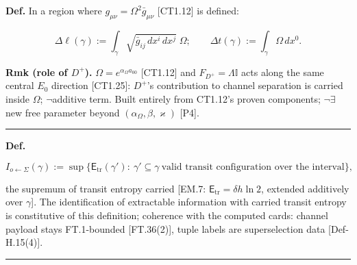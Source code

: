 \begin{definition}\label{tag:Def-H-2}
\textbf{Def.} In a region where $g_{\mu\nu}=\Omega^2\bar g_{\mu\nu}$ [CT1.12] is defined:

\[
\Delta\ell(\gamma):=\int_\gamma\sqrt{\bar g_{ij}\,dx^i\,dx^j}\;\Omega;\qquad
\Delta t(\gamma):=\int_\gamma\Omega\,dx^0 .
\]

\textbf{Rmk (role of $D^+$).} $\Omega=e^{\alpha_\Omega a_{00}}$ [CT1.12] and $F_{D^+}=\Lambda\mathbb I$ acts along the same central $E_0$ direction [CT1.25]: $D^+$'s contribution to channel separation is carried inside $\Omega$; $\neg$additive term. Built entirely from CT1.12's proven components; $\neg\exists$ new free parameter beyond $(\alpha_\Omega,\beta,\varkappa)$ [P4].

\vspace{2pt}\noindent\rule{\textwidth}{0.4pt}\vspace{2pt}

\end{definition}

\begin{definition}\label{tag:Def-H-3}
\textbf{Def.}

\[
I_{o\leftarrow\Sigma}(\gamma):=\sup\bigl\{\mathsf E_{\mathrm{tr}}(\gamma'):\ \gamma'\subseteq\gamma\ \text{valid transit configuration over the interval}\bigr\},
\]

the supremum of transit entropy carried [EM.7: $\mathsf E_{\mathrm{tr}}=\delta h\ln2$, extended additively over $\gamma$]. The identification of extractable information with carried transit entropy is constitutive of this definition; coherence with the computed cards: channel payload stays FT.1-bounded [FT.36(2)], tuple labels are superselection data [Def-H.15(4)].

\vspace{2pt}\noindent\rule{\textwidth}{0.4pt}\vspace{2pt}

\end{definition}

